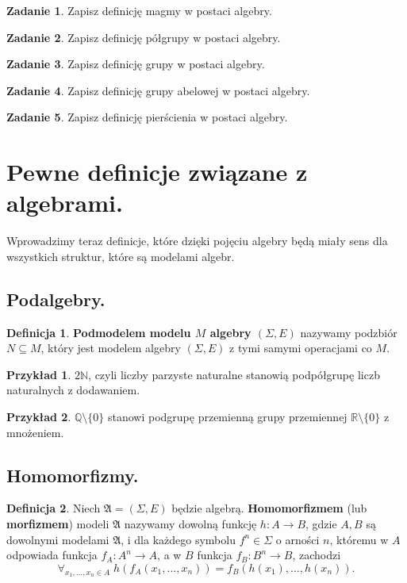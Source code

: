 \documentclass{book}
\theoremstyle{definition}
\newtheorem{definition}{Definicja}[section]
\newtheorem{example}{Przykład}[section]
\newtheorem{exercise}{Zadanie}[section]
\begin{document}
\begin{exercise}
	Zapisz definicję magmy w postaci algebry.
\end{exercise}
\begin{exercise}
	Zapisz definicję półgrupy w postaci algebry.
\end{exercise}
\begin{exercise}
	Zapisz definicję grupy w postaci algebry.
\end{exercise}
\begin{exercise}
	Zapisz definicję grupy abelowej w postaci algebry.
\end{exercise}
\begin{exercise}
	Zapisz definicję pierścienia w postaci algebry.
\end{exercise}

\section{Pewne definicje związane z algebrami.}

Wprowadzimy teraz definicje,
	które dzięki pojęciu algebry będą miały sens dla wszystkich struktur,
	które są modelami algebr.

\subsection{Podalgebry.}

\begin{definition}
    \textbf{Podmodelem modelu $M$ algebry $(\Sigma, E)$} nazywamy podzbiór $N \subseteq M$,
		który jest modelem algebry $(\Sigma, E)$ z tymi samymi operacjami co $M$.
\end{definition}

\begin{example}
	$2\mathbb{N}$, czyli liczby parzyste naturalne stanowią podpółgrupę liczb naturalnych z dodawaniem.
\end{example}
\begin{example}
	$\mathbb{Q} \setminus \{0\}$ stanowi podgrupę przemienną grupy przemiennej $\mathbb{R} \setminus \{0\}$ z mnożeniem.
\end{example}

\subsection{Homomorfizmy.}

\begin{definition}
    Niech $\mathfrak{A} = (\Sigma, E)$ będzie algebrą.
	\textbf{Homomorfizmem} (lub \textbf{morfizmem}) modeli $\mathfrak{A}$ nazywamy dowolną funkcję
		$h: A \to B$, gdzie $A, B$ są dowolnymi modelami $\mathfrak{A}$,
		i dla każdego symbolu $f^n \in \Sigma$ o arności $n$,
			któremu w $A$ odpowiada funkcja $f_A: A^n \to A$,
			a w $B$ funkcja $f_B: B^n \to B$,
		 zachodzi
	\begin{equation}
		\forall_{x_1, \dots, x_n \in A} \; h(f_A(x_1, \dots, x_n)) = f_B(h(x_1), \dots, h(x_n)).
	\end{equation}
\end{definition}
\end{document}
